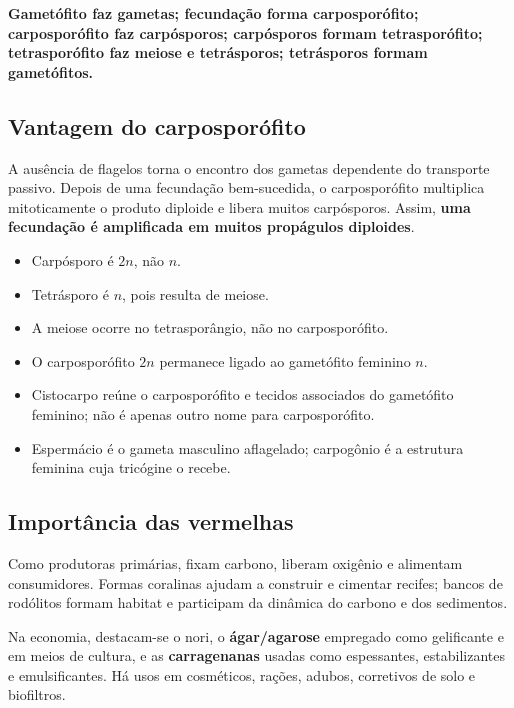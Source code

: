 \documentclass[12pt,a4paper]{article}
\newcommand{\n}{\ensuremath{n}}
\newcommand{\dn}{\ensuremath{2n}}
\begin{document}
\begin{essencial}[title={Frase para memorizar o ciclo trifásico}]
\textbf{Gametófito faz gametas; fecundação forma carposporófito; carposporófito
faz carpósporos; carpósporos formam tetrasporófito; tetrasporófito faz meiose e
tetrásporos; tetrásporos formam gametófitos.}
\end{essencial}

\subsection{Vantagem do carposporófito}
A ausência de flagelos torna o encontro dos gametas dependente do transporte
passivo. Depois de uma fecundação bem-sucedida, o carposporófito multiplica
mitoticamente o produto diploide e libera muitos carpósporos. Assim,
\textbf{uma fecundação é amplificada em muitos propágulos diploides}.

\begin{cuidado}[title={Erros clássicos no ciclo das vermelhas}]
\begin{itemize}
\item Carpósporo é \dn, não \n.
\item Tetrásporo é \n, pois resulta de meiose.
\item A meiose ocorre no tetrasporângio, não no carposporófito.
\item O carposporófito \dn{} permanece ligado ao gametófito feminino \n.
\item Cistocarpo reúne o carposporófito e tecidos associados do gametófito
feminino; não é apenas outro nome para carposporófito.
\item Espermácio é o gameta masculino aflagelado; carpogônio é a estrutura
feminina cuja tricógine o recebe.
\end{itemize}
\end{cuidado}

\subsection{Importância das vermelhas}
Como produtoras primárias, fixam carbono, liberam oxigênio e alimentam
consumidores. Formas coralinas ajudam a construir e cimentar recifes; bancos de
rodólitos formam habitat e participam da dinâmica do carbono e dos sedimentos.

Na economia, destacam-se o nori, o \textbf{ágar/agarose} empregado como
gelificante e em meios de cultura, e as \textbf{carragenanas} usadas como
espessantes, estabilizantes e emulsificantes. Há usos em cosméticos, rações,
adubos, corretivos de solo e biofiltros.
\end{document}
